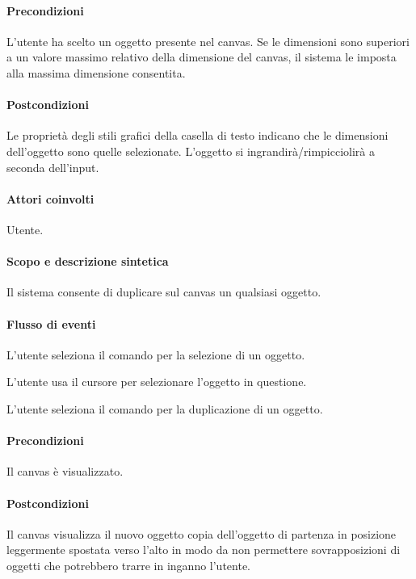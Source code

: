 \paragraph{Precondizioni} L'utente ha scelto un oggetto presente nel canvas. Se le dimensioni sono superiori a un valore massimo relativo della dimensione del canvas, il sistema le imposta alla massima dimensione consentita.
\paragraph{Postcondizioni} Le propriet\`a  degli stili grafici della casella di testo indicano che le dimensioni dell'oggetto sono quelle selezionate. L'oggetto si ingrandir\` a/rimpicciolir\`a a seconda dell'input.

\paragraph{Attori coinvolti} Utente.
\paragraph{Scopo e descrizione sintetica} Il sistema consente di duplicare sul canvas un qualsiasi oggetto.
\paragraph{Flusso di eventi}
\begin{elenconumerato}[\textbf{}]{\subsubsecindent}
\item  L'utente seleziona il comando per la selezione di un oggetto.
\item  L'utente usa il cursore per selezionare l'oggetto in questione.
\item  L'utente seleziona il comando per la duplicazione di un oggetto.
\end{elenconumerato}
\paragraph{Precondizioni} Il canvas \`e visualizzato. 
\paragraph{Postcondizioni} Il canvas visualizza il nuovo oggetto copia dell'oggetto di partenza in posizione leggermente spostata verso l'alto in modo da non permettere sovrapposizioni di oggetti che potrebbero trarre in inganno l'utente.

